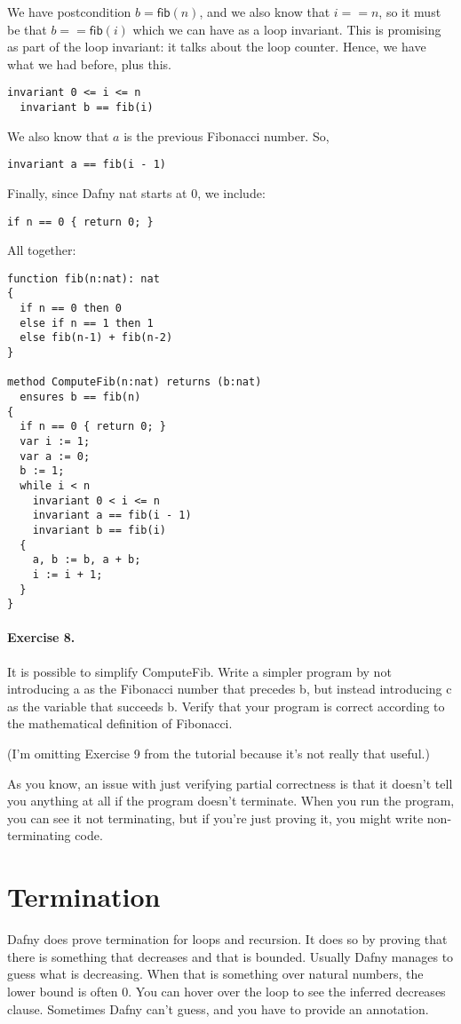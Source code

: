 \documentclass[11pt]{article}
\begin{document}
We have postcondition $b = \mathsf{fib}(n)$, and we also know
that $i == n$, so it must be that $b == \mathsf{fib}(i)$ which we can have as a loop invariant. This
is promising as part of the loop invariant: it talks about the loop counter. Hence, we have what we had before,
plus this.
\begin{lstlisting}[language=dafny]
  invariant 0 <= i <= n
  invariant b == fib(i)
\end{lstlisting}
We also know that $a$ is the previous Fibonacci number. So,
\begin{lstlisting}[language=dafny]
  invariant a == fib(i - 1)
\end{lstlisting}
Finally, since Dafny \textsf{nat} starts at 0, we include:
\begin{lstlisting}[language=dafny]
  if n == 0 { return 0; }
\end{lstlisting}
All together:
\begin{lstlisting}[language=dafny]
function fib(n:nat): nat
{
  if n == 0 then 0
  else if n == 1 then 1
  else fib(n-1) + fib(n-2)
}

method ComputeFib(n:nat) returns (b:nat)
  ensures b == fib(n)
{
  if n == 0 { return 0; }
  var i := 1;
  var a := 0;
  b := 1;
  while i < n
    invariant 0 < i <= n
    invariant a == fib(i - 1)
    invariant b == fib(i)
  {
    a, b := b, a + b;
    i := i + 1;
  }
}
\end{lstlisting}


\paragraph{Exercise 8.} It is possible to simplify \textsf{ComputeFib}.
Write a simpler program by not introducing \textsf{a} as the Fibonacci number
that precedes \textsf{b}, but instead introducing \textsf{c} as the variable that
succeeds \textsf{b}. Verify that your program is correct according to the mathematical
definition of Fibonacci.

(I'm omitting Exercise 9 from the tutorial because it's not really that useful.)

As you know, an issue with just verifying partial correctness is that it doesn't tell you
anything at all if the program doesn't terminate. When you run the program, you can see it not
terminating, but if you're just proving it, you might write non-terminating code.

\section*{Termination}
Dafny does prove termination for loops and recursion. It does so by proving that there is something
that decreases and that is bounded. Usually Dafny manages to guess what is decreasing. When that is
something over natural numbers, the lower bound is often 0. You can hover over
the loop to see the inferred decreases clause. Sometimes Dafny can't guess, and you have to provide an annotation.
\end{document}
